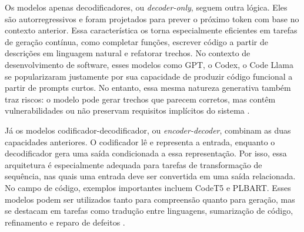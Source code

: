 Os modelos apenas decodificadores, ou \textit{decoder-only}, seguem outra lógica. Eles são autorregressivos e foram projetados para prever o próximo token com base no contexto anterior. Essa característica os torna especialmente eficientes em tarefas de geração contínua, como completar funções, escrever código a partir de descrições em linguagem natural e refatorar trechos. No contexto de desenvolvimento de software, esses modelos como GPT, o Codex, o Code Llama se popularizaram justamente por sua capacidade de produzir código funcional a partir de prompts curtos. No entanto, essa mesma natureza generativa também traz riscos: o modelo pode gerar trechos que parecem corretos, mas contêm vulnerabilidades ou não preservam requisitos implícitos do sistema \cite{minaee_large_2025}.

Já os modelos codificador-decodificador, ou \textit{encoder-decoder}, combinam as duas capacidades anteriores. O codificador lê e representa a entrada, enquanto o decodificador gera uma saída condicionada a essa representação. Por isso, essa arquitetura é especialmente adequada para tarefas de transformação de sequência, nas quais uma entrada deve ser convertida em uma saída relacionada. No campo de código, exemplos importantes incluem CodeT5 e PLBART. Esses modelos podem ser utilizados tanto para compreensão quanto para geração, mas se destacam em tarefas como tradução entre linguagens, sumarização de código, refinamento e reparo de defeitos \cite{minaee_large_2025}.

